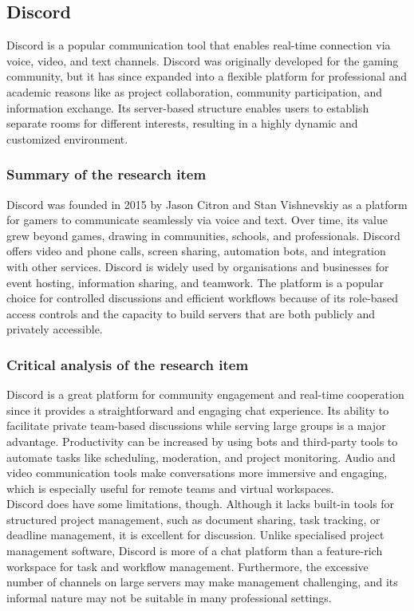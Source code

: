 \documentclass{FastFyp}
\begin{document}
\subsection{Discord}
Discord is a popular communication tool that enables real-time connection via voice, video, and text channels.  Discord was originally developed for the gaming community, but it has since expanded into a flexible platform for professional and academic reasons like as project collaboration, community participation, and information exchange.  Its server-based structure enables users to establish separate rooms for different interests, resulting in a highly dynamic and customized environment.

\subsubsection{Summary of the research item}
Discord was founded in 2015 by Jason Citron and Stan Vishnevskiy as a platform for gamers to communicate seamlessly via voice and text.  Over time, its value grew beyond games, drawing in communities, schools, and professionals.  Discord offers video and phone calls, screen sharing, automation bots, and integration with other services.   Discord is widely used by organisations and businesses for event hosting, information sharing, and teamwork.   The platform is a popular choice for controlled discussions and efficient workflows because of its role-based access controls and the capacity to build servers that are both publicly and privately accessible.
\subsubsection{Critical analysis of the research item}
Discord is a great platform for community engagement and real-time cooperation since it provides a straightforward and engaging chat experience.  Its ability to facilitate private team-based discussions while serving large groups is a major advantage.  Productivity can be increased by using bots and third-party tools to automate tasks like scheduling, moderation, and project monitoring.  Audio and video communication tools make conversations more immersive and engaging, which is especially useful for remote teams and virtual workspaces.\\
Discord does have some limitations, though.   Although it lacks built-in tools for structured project management, such as document sharing, task tracking, or deadline management, it is excellent for discussion.   Unlike specialised project management software, Discord is more of a chat platform than a feature-rich workspace for task and workflow management.   Furthermore, the excessive number of channels on large servers may make management challenging, and its informal nature may not be suitable in many professional settings.
\end{document}
